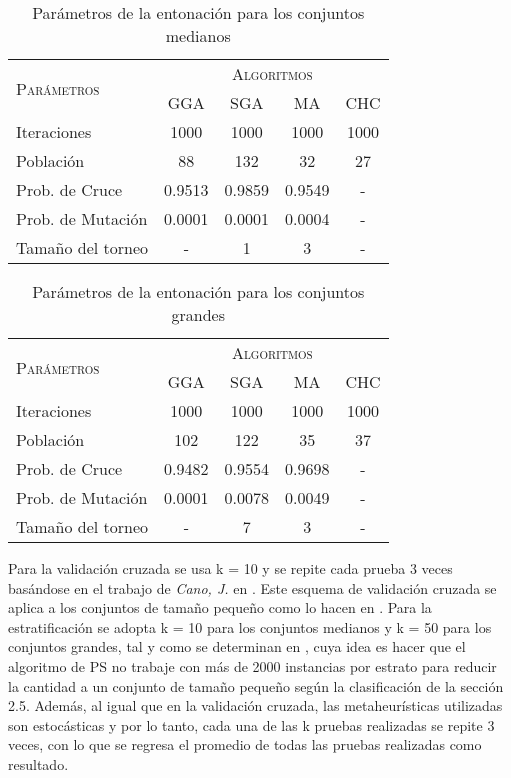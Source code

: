 \begin{table}[]
\centering
\begin{tabular}{l c c c c}
\hline
\multirow{2}{*}{\textsc{Parámetros}}
	& \multicolumn{4}{c}{\textsc{Algoritmos}} \\
	& GGA & SGA & MA & CHC \\
\hline
\hline
Iteraciones             &  1000    &  1000    &  1000      &  1000 \\
Población               &    88    &    132   &    32      &    27 \\
Prob. de Cruce          &   0.9513 &   0.9859 &     0.9549 &     - \\
Prob. de Mutación       &   0.0001 &  0.0001  &     0.0004 &     - \\
Tamaño del torneo       &   -      &    1     &     3      &     - \\
\hline
\end{tabular}
\caption{Parámetros de la entonación para los conjuntos medianos}
\label{param-med}
\end{table}

\begin{table}[]
\centering
\begin{tabular}{l c c c c}
\hline
\multirow{2}{*}{\textsc{Parámetros}}
	& \multicolumn{4}{c}{\textsc{Algoritmos}} \\
	& GGA & SGA & MA & CHC \\
\hline
\hline
Iteraciones             &  1000    &  1000    &  1000      &  1000 \\
Población               &    102   &    122   &    35      &    37 \\
Prob. de Cruce          &   0.9482 &   0.9554 &     0.9698 &     - \\
Prob. de Mutación       &   0.0001 &  0.0078  &     0.0049 &     - \\
Tamaño del torneo       &   -      &    7     &     3      &     - \\
\hline
\end{tabular}
\caption{Parámetros de la entonación para los conjuntos grandes}
\label{param-grande}
\end{table}

Para la validación cruzada se usa k = 10 y se repite cada prueba 3 veces basándose en el trabajo de \emph{Cano, J.} en \cite{de2004reduccion}. Este esquema de validación cruzada se aplica a los conjuntos de tamaño pequeño como lo hacen en \cite{de2004reduccion}. Para la estratificación se adopta k = 10 para los conjuntos medianos y k = 50 para los conjuntos grandes, tal y como se determinan en \cite{cano2005stratification}, cuya idea es hacer que el algoritmo de PS no trabaje con más de 2000 instancias por estrato para reducir la cantidad a un conjunto de tamaño pequeño según la clasificación de la sección 2.5. Además, al igual que en la validación cruzada, las metaheurísticas utilizadas son estocásticas y por lo tanto, cada una de las k pruebas realizadas se repite 3 veces, con lo que se regresa el promedio de todas las pruebas realizadas como resultado.

